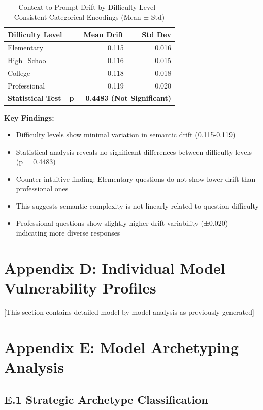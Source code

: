 \documentclass[letterpaper]{article}
\begin{document}
\begin{table}[ht]
\centering
\caption{Context-to-Prompt Drift by Difficulty Level - Consistent Categorical Encodings (Mean ± Std)}
\label{tab:difficulty_analysis_detailed}
\begin{tabular}{lrr}
\toprule
\textbf{Difficulty Level} & \textbf{Mean Drift} & \textbf{Std Dev} \\
\midrule
Elementary & 0.115 & 0.016 \\
High\_School & 0.116 & 0.015 \\
College & 0.118 & 0.018 \\
Professional & 0.119 & 0.020 \\
\midrule
\textbf{Statistical Test} & \multicolumn{2}{c}{\textbf{p = 0.4483 (Not Significant)}} \\
\bottomrule
\end{tabular}
\end{table}

\textbf{Key Findings:}
\begin{itemize}
\item Difficulty levels show minimal variation in semantic drift (0.115-0.119)
\item Statistical analysis reveals no significant differences between difficulty levels (p = 0.4483)
\item Counter-intuitive finding: Elementary questions do not show lower drift than professional ones
\item This suggests semantic complexity is not linearly related to question difficulty
\item Professional questions show slightly higher drift variability (±0.020) indicating more diverse responses
\end{itemize}

\section*{Appendix D: Individual Model Vulnerability Profiles}
\label{sec:individual_profiles}

[This section contains detailed model-by-model analysis as previously generated]

\section*{Appendix E: Model Archetyping Analysis}
\label{app:archetypes}

\subsection*{E.1 Strategic Archetype Classification}
\end{document}
